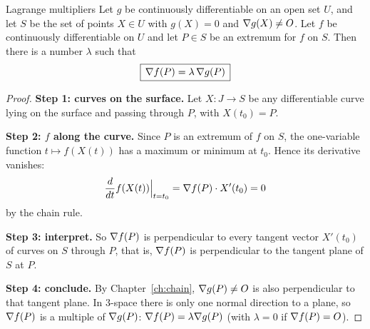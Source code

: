 \begin{theorem}[label=thm:lagrange]{Lagrange multipliers}
Let $g$ be continuously differentiable on an open set $U$, and let $S$ be the set of points
$X\in U$ with $g(X)=0$ and $\nabla g(X)\neq O$. Let $f$ be continuously differentiable on $U$ and
let $P\in S$ be an extremum for $f$ on $S$. Then there is a number $\lambda$ such that
\[ \boxed{\,\nabla f(P)=\lambda\,\nabla g(P)\,} \]
\end{theorem}

\begin{proof}
\textbf{Step 1: curves on the surface.} Let $X:J\to S$ be any differentiable curve lying on the
surface and passing through $P$, with $X(t_0)=P$.

\textbf{Step 2: $f$ along the curve.} Since $P$ is an extremum of $f$ on $S$, the one-variable
function $t\mapsto f(X(t))$ has a maximum or minimum at $t_0$. Hence its derivative vanishes:
\[ \frac{d}{dt}f(X(t))\Big|_{t=t_0}=\nabla f(P)\cdot X'(t_0)=0 \]
by the chain rule.

\textbf{Step 3: interpret.} So $\nabla f(P)$ is perpendicular to every tangent vector $X'(t_0)$ of
curves on $S$ through $P$, that is, $\nabla f(P)$ is perpendicular to the tangent plane of $S$ at $P$.

\textbf{Step 4: conclude.} By Chapter~\ref{ch:chain}, $\nabla g(P)\neq O$ is also perpendicular
to that tangent plane. In $3$-space there is only one normal direction to a plane, so
$\nabla f(P)$ is a multiple of $\nabla g(P)$: $\nabla f(P)=\lambda\nabla g(P)$ (with $\lambda=0$ if
$\nabla f(P)=O$).
\end{proof}

\begin{center}
\end{center}

